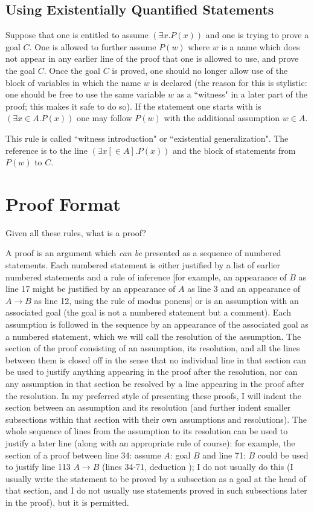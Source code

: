\documentclass[12pt]{book}
\begin{document}
\subsection{Using Existentially Quantified Statements}

Suppose that one is entitled to assume $(\exists x.P(x))$ and one is trying to prove a goal $C$.  One is allowed
to further assume $P(w)$ where $w$ is a name which does not appear in any earlier line of the proof that one is allowed to use, and prove the goal $C$.  Once the goal $C$ is proved, one should no longer allow use of the block of variables
in which the name $w$ is declared (the reason for this is stylistic:  one should be free to use the same variable $w$ as a ``witness" in a later part of the proof; this makes it safe to do so).   If the statement one starts with is $(\exists x \in A.P(x))$ one may follow $P(w)$ with the additional assumption $w \in A$.

This rule is called ``witness introduction" or ``existential generalization".  The reference is to the line $(\exists x[\in A].P(x))$ and the block of statements from $P(w)$ to $C$.


\section{Proof Format}

Given all these rules, what is a proof?

A proof is an argument which {\em can be\/} presented as a sequence of numbered statements.  Each numbered statement is either justified
by a list of earlier numbered statements and a rule of inference [for example, an appearance of $B$ as line 17 might be justified by an appearance of $A$ as line 3 and an appearance of $A \rightarrow B$ as line 12, using the rule of modus ponens] or is an assumption with an associated goal (the goal is not a numbered statement but a comment).  Each assumption is followed in the sequence by an appearance of the associated goal as a numbered statement, which we will call the resolution of the assumption.  The section of the proof consisting of an assumption, its resolution, and all the lines between them  is closed off in the sense that no individual line in that section can be used to justify anything appearing in the proof after the resolution, nor can any assumption in that section be resolved by a line appearing in the proof after the resolution.  In my preferred style of presenting these proofs, I will indent the section between an assumption and its resolution (and further indent smaller subsections within that section with their own assumptions and resolutions).  The whole sequence of lines from the assumption to its resolution can be used to justify a later line (along with an appropriate rule of course):  for example, the section of a proof between line 34:  assume $A$:  goal $B$ and line 71:  $B$ could be used to justify line 113 $A \rightarrow B$ (lines 34-71, deduction
); I do not usually do this (I usually write the statement to be proved by a subsection as a goal at the head of that section, and I do not usually use statements proved in such subsections later in the proof), but it is permitted.
\end{document}
